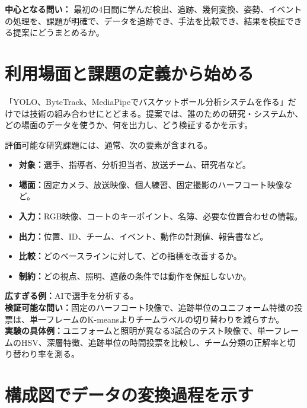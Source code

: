 \documentclass[11pt,a4paper,oneside]{report}
\begin{document}
\begin{heroBox}
\textbf{中心となる問い：}\quad
最初の4日間に学んだ検出、追跡、幾何変換、姿勢、イベントの処理を、課題が明確で、データを追跡でき、手法を比較でき、結果を検証できる提案にどうまとめるか。
\end{heroBox}

\section{利用場面と課題の定義から始める}

\begin{conceptBox}
「YOLO、ByteTrack、MediaPipeでバスケットボール分析システムを作る」だけでは技術の組み合わせにとどまる。提案では、誰のための研究・システムか、どの場面のデータを使うか、何を出力し、どう検証するかを示す。
\end{conceptBox}

評価可能な研究課題には、通常、次の要素が含まれる。

\begin{itemize}
  \item \textbf{対象：}選手、指導者、分析担当者、放送チーム、研究者など。
  \item \textbf{場面：}固定カメラ、放送映像、個人練習、固定撮影のハーフコート映像など。
  \item \textbf{入力：}RGB映像、コートのキーポイント、名簿、必要な位置合わせの情報。
  \item \textbf{出力：}位置、ID、チーム、イベント、動作の計測値、報告書など。
  \item \textbf{比較：}どのベースラインに対して、どの指標を改善するか。
  \item \textbf{制約：}どの視点、照明、遮蔽の条件では動作を保証しないか。
\end{itemize}

\begin{plainBox}
\textbf{広すぎる例：}AIで選手を分析する。\\
\textbf{検証可能な問い：}固定のハーフコート映像で、追跡単位のユニフォーム特徴の投票は、単一フレームのK-meansよりチームラベルの切り替わりを減らすか。\\
\textbf{実験の具体例：}ユニフォームと照明が異なる3試合のテスト映像で、単一フレームのHSV、深層特徴、追跡単位の時間投票を比較し、チーム分類の正解率と切り替わり率を測る。
\end{plainBox}

\clearpage
\section{構成図でデータの変換過程を示す}
\end{document}
